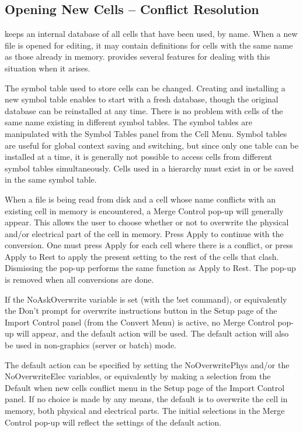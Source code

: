 \subsection{Opening New Cells -- Conflict Resolution}

{\Xic} keeps an internal database of all cells that have been used, by
name.  When a new file is opened for editing, it may contain
definitions for cells with the same name as those already in memory. 
{\Xic} provides several features for dealing with this situation when
it arises.

The symbol table used to store cells can be changed.  Creating and
installing a new symbol table enables {\Xic} to start with a fresh
database, though the original database can be reinstalled at any time. 
There is no problem with cells of the same name existing in different
symbol tables.  The symbol tables are manipulated with the {\cb Symbol
Tables} panel from the {\cb Cell Menu}.  Symbol tables are useful for
global context saving and switching, but since only one table can be
installed at a time, it is generally not possible to access cells from
different symbol tables simultaneously.  Cells used in a hierarchy
must exist in or be saved in the same symbol table.

When a file is being read from disk and a cell whose name conflicts
with an existing cell in memory is encountered, a {\cb Merge Control}
pop-up will generally appear.  This allows the user to choose whether
or not to overwrite the physical and/or electrical part of the cell in
memory.  Press {\cb Apply} to continue with the conversion.  One must
press {\cb Apply} for each cell where there is a conflict, or press
{\cb Apply to Rest} to apply the present setting to the rest of the
cells that clash.  Dismissing the pop-up performs the same function as
{\cb Apply to Rest}.  The pop-up is removed when all conversions are
done.

If the {\et NoAskOverwrite} variable is set (with the {\cb !set}
command), or equivalently the {\cb Don't prompt for overwrite
instructions} button in the {\cb Setup} page of the {\cb Import
Control} panel (from the {\cb Convert Menu}) is active, no {\cb Merge
Control} pop-up will appear, and the default action will be used.  The
default action will also be used in non-graphics (server or batch)
mode.

The default action can be specified by setting the {\et
NoOverwritePhys} and/or the {\et NoOverwriteElec} variables, or
equivalently by making a selection from the {\cb Default when new
cells conflict} menu in the {\cb Setup} page of the {\cb Import
Control} panel.  If no choice is made by any means, the default is to
overwrite the cell in memory, both physical and electrical parts.  The
initial selections in the {\cb Merge Control} pop-up will reflect the
settings of the default action.

